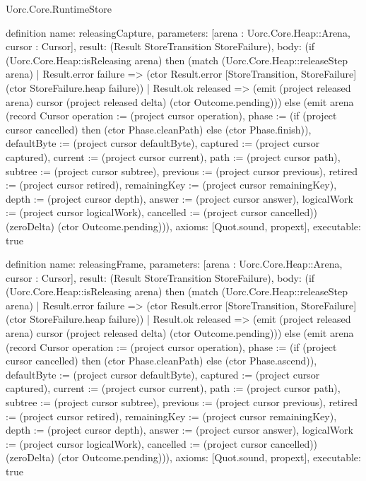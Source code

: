 \begin{lexlean}{Uorc.Core.RuntimeStore}
\begin{semanticmodule}
definition{
  name: releasingCapture,
  parameters: [arena : Uorc.Core.Heap::Arena, cursor : Cursor],
  result: (Result StoreTransition StoreFailure),
  body: (if (Uorc.Core.Heap::isReleasing arena) then (match (Uorc.Core.Heap::releaseStep arena)
    | Result.error failure => (ctor Result.error [StoreTransition, StoreFailure] (ctor StoreFailure.heap failure))
    | Result.ok released => (emit (project released arena) cursor (project released delta) (ctor Outcome.pending))) else (emit arena (record Cursor {operation := (project cursor operation), phase := (if (project cursor cancelled) then (ctor Phase.cleanPath) else (ctor Phase.finish)), defaultByte := (project cursor defaultByte), captured := (project cursor captured), current := (project cursor current), path := (project cursor path), subtree := (project cursor subtree), previous := (project cursor previous), retired := (project cursor retired), remainingKey := (project cursor remainingKey), depth := (project cursor depth), answer := (project cursor answer), logicalWork := (project cursor logicalWork), cancelled := (project cursor cancelled)}) (zeroDelta) (ctor Outcome.pending))),
  axioms: [Quot.sound, propext],
  executable: true
}

definition{
  name: releasingFrame,
  parameters: [arena : Uorc.Core.Heap::Arena, cursor : Cursor],
  result: (Result StoreTransition StoreFailure),
  body: (if (Uorc.Core.Heap::isReleasing arena) then (match (Uorc.Core.Heap::releaseStep arena)
    | Result.error failure => (ctor Result.error [StoreTransition, StoreFailure] (ctor StoreFailure.heap failure))
    | Result.ok released => (emit (project released arena) cursor (project released delta) (ctor Outcome.pending))) else (emit arena (record Cursor {operation := (project cursor operation), phase := (if (project cursor cancelled) then (ctor Phase.cleanPath) else (ctor Phase.ascend)), defaultByte := (project cursor defaultByte), captured := (project cursor captured), current := (project cursor current), path := (project cursor path), subtree := (project cursor subtree), previous := (project cursor previous), retired := (project cursor retired), remainingKey := (project cursor remainingKey), depth := (project cursor depth), answer := (project cursor answer), logicalWork := (project cursor logicalWork), cancelled := (project cursor cancelled)}) (zeroDelta) (ctor Outcome.pending))),
  axioms: [Quot.sound, propext],
  executable: true
}


\end{semanticmodule}
\end{lexlean}
